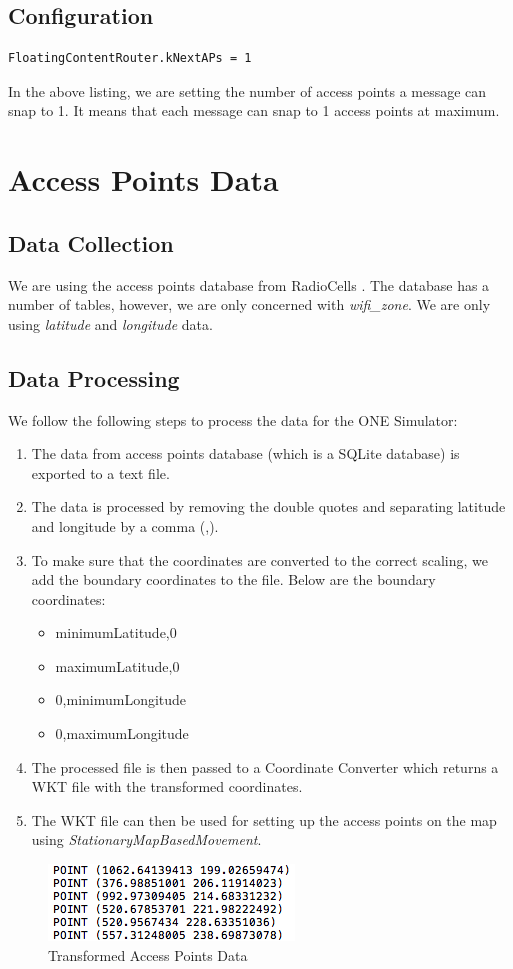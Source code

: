 \subsection{Configuration}
\begin{lstlisting}[language=bash]
FloatingContentRouter.kNextAPs = 1
\end{lstlisting}
In the above listing, we are setting the number of access points a message can snap to 1. It means that each message can snap to 1 access points at maximum.\newline
\vspace{4mm}
\section{Access Points Data}
\subsection{Data Collection}
We are using the access points database from RadioCells \cite{wifi-data}. The database has a number of tables, however, we are only concerned with \textit{wifi\_zone}. We are only using \textit{latitude} and \textit{longitude} data.
\subsection{Data Processing}
We follow the following steps to process the data for the ONE Simulator:
\begin{enumerate}
	\item The data from access points database (which is a SQLite database) \cite{wifi-data} is exported to a text file.
	\item The data is processed by removing the double quotes and separating latitude and longitude by a comma (,).
	\item To make sure that the coordinates are converted to the correct scaling, we add the boundary coordinates to the file. Below are the boundary coordinates:
	\begin{itemize}
		\item minimumLatitude,0
		\item maximumLatitude,0
		\item 0,minimumLongitude
		\item 0,maximumLongitude
	\end{itemize}
	\item The processed file is then passed to a Coordinate Converter which returns a WKT file with the transformed coordinates.
	\item The WKT file can then be used for setting up the access points on the map using \textit{StationaryMapBasedMovement}.
\end{enumerate}
\begin{figure}[h]
	\centering
	\includegraphics{./figures/access-points-data}
	\caption{Transformed Access Points Data}
\end{figure}
